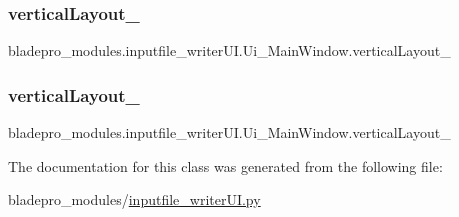 \subsubsection{\texorpdfstring{vertical\+Layout\+\_}{verticalLayout\_2}}
{\footnotesize\ttfamily bladepro\+\_\+modules.\+inputfile\+\_\+writer\+U\+I.\+Ui\+\_\+\+Main\+Window.\+vertical\+Layout\+\_}

\hypertarget{a00074_ab105030a0e14f15ea1514f18cd3202b7}{}\label{a00074_ab105030a0e14f15ea1514f18cd3202b7} 
\subsubsection{\texorpdfstring{vertical\+Layout\+\_}{verticalLayout\_3}}
{\footnotesize\ttfamily bladepro\+\_\+modules.\+inputfile\+\_\+writer\+U\+I.\+Ui\+\_\+\+Main\+Window.\+vertical\+Layout\+\_}



The documentation for this class was generated from the following file\+:\begin{DoxyCompactItemize}
\item 
bladepro\+\_\+modules/\hyperlink{a00008}{inputfile\+\_\+writer\+U\+I.\+py}\end{DoxyCompactItemize}
